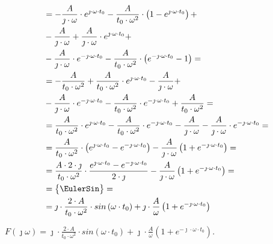 \begin{task}
\begin{align*}
&= -\frac{A}{\jmath \cdot \omega} \cdot e^{\jmath \cdot \omega \cdot t_0} - \frac{A}{t_0 \cdot \omega^2} \cdot \left( 1 - e^{\jmath \cdot \omega \cdot t_0}\right) + \\
&- \frac{A}{\jmath \cdot \omega} + \frac{A}{\jmath \cdot \omega} \cdot e^{\jmath \cdot \omega \cdot t_0} + \\
&- \frac{A}{\jmath \cdot \omega} \cdot e^{-\jmath \cdot \omega \cdot t_0} - \frac{A}{t_0 \cdot \omega^2} \cdot \left( e^{-\jmath \cdot \omega \cdot t_0} - 1\right) = \\
&= -\frac{A}{t_0 \cdot \omega^2} + \frac{A}{t_0 \cdot \omega^2} \cdot  e^{\jmath \cdot \omega \cdot t_0} - \frac{A}{\jmath \cdot \omega} + \\
&- \frac{A}{\jmath \cdot \omega} \cdot e^{-\jmath \cdot \omega \cdot t_0} - \frac{A}{t_0 \cdot \omega^2} \cdot e^{-\jmath \cdot \omega \cdot t_0} + \frac{A}{t_0 \cdot \omega^2} = \\
&= \frac{A}{t_0 \cdot \omega^2} \cdot  e^{\jmath \cdot \omega \cdot t_0} - \frac{A}{t_0 \cdot \omega^2} \cdot e^{-\jmath \cdot \omega \cdot t_0} - \frac{A}{\jmath \cdot \omega} - \frac{A}{\jmath \cdot \omega} \cdot e^{-\jmath \cdot \omega \cdot t_0}  = \\
&= \frac{A}{t_0 \cdot \omega^2} \cdot  \left( e^{\jmath \cdot \omega \cdot t_0} - e^{-\jmath \cdot \omega \cdot t_0} \right) - \frac{A}{\jmath \cdot \omega} \left( 1+  e^{-\jmath \cdot \omega \cdot t_0} \right)  = \\
&= \frac{A \cdot 2 \cdot \jmath}{t_0 \cdot \omega^2} \cdot  \frac{ e^{\jmath \cdot \omega \cdot t_0} - e^{-\jmath \cdot \omega \cdot t_0} }{2\cdot \jmath} - \frac{A}{\jmath \cdot \omega} \left( 1+  e^{-\jmath \cdot \omega \cdot t_0} \right)  = \\
&=\begin{Bmatrix}
\EulerSin
\end{Bmatrix}=\\
&= \jmath \cdot \frac{2 \cdot A}{t_0 \cdot \omega^2} \cdot  sin\left(\omega \cdot t_0\right) + \jmath \cdot \frac{A}{\omega} \left( 1+  e^{-\jmath \cdot \omega \cdot t_0} \right)
\end{align*}

 $F(\jmath \omega)=\jmath \cdot \frac{2 \cdot A}{t_0 \cdot \omega^2} \cdot  sin\left(\omega \cdot t_0\right) + \jmath \cdot \frac{A}{\omega} \left( 1+  e^{-\jmath \cdot \omega \cdot t_0} \right)$.



\end{task}
